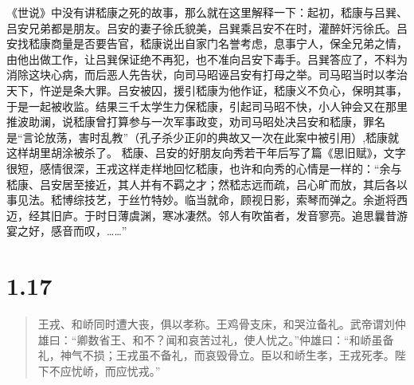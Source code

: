 \documentclass[]{book}
\begin{document}
《世说》中没有讲嵇康之死的故事，那么就在这里解释一下：起初，嵇康与吕巽、吕安兄弟都是朋友。吕安的妻子徐氏貌美，吕巽乘吕安不在时，灌醉奸污徐氏。吕安找嵇康商量是否要告官，嵇康说出自家门名誉考虑，息事宁人，保全兄弟之情，由他出做工作，让吕巽保证绝不再犯，也不准向吕安下毒手。吕巽答应了，不料为消除这块心病，而后恶人先告状，向司马昭诬吕安有打母之举。司马昭当时以孝治天下，忤逆是条大罪。吕安被囚，援引嵇康为他作证，嵇康义不负心，保明其事，于是一起被收监。结果三千太学生力保嵇康，引起司马昭不快，小人钟会又在那里推波助澜，说嵇康曾打算参与一次军事政变，劝司马昭处决吕安和嵇康，罪名是``言论放荡，害时乱教''（孔子杀少正卯的典故又一次在此案中被引用）,嵇康就这样胡里胡涂被杀了。
嵇康、吕安的好朋友向秀若干年后写了篇《思旧赋》，文字很短，感情很深，王戎这样走样地回忆嵇康，也许和向秀的心情是一样的：``余与嵇康、吕安居至接近，其人并有不羁之才；然嵇志远而疏，吕心旷而放，其后各以事见法。嵇博综技艺，于丝竹特妙。临当就命，顾视日影，索琴而弹之。余逝将西迈，经其旧庐。于时日薄虞渊，寒冰凄然。邻人有吹笛者，发音寥亮。追思曩昔游宴之好，感音而叹，\ldots{}\ldots{}''

\section{1.17}\label{section-16}

\begin{quote}
王戎、和峤同时遭大丧，俱以孝称。王鸡骨支床，和哭泣备礼。武帝谓刘仲雄曰：``卿数省王、和不？闻和哀苦过礼，使人忧之。''仲雄曰：``和峤虽备礼，神气不损；王戎虽不备礼，而哀毁骨立。臣以和峤生孝，王戎死孝。陛下不应忧峤，而应忧戎。''
\end{quote}
\end{document}
